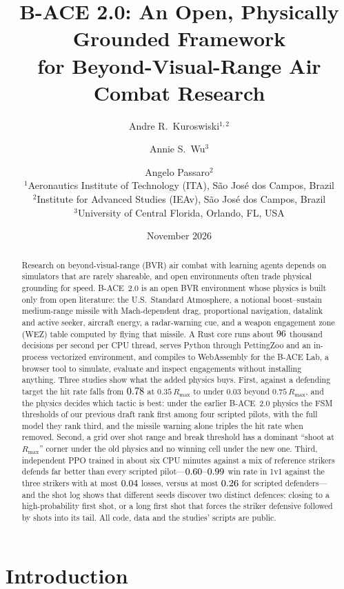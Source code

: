 \documentclass[11pt,a4paper]{article}
\title{\textbf{B-ACE 2.0}: An Open, Physically Grounded Framework\\
for Beyond-Visual-Range Air Combat Research}
\author{
Andre R.\ Kuroswiski$^{1,2}$ \and
Annie S.\ Wu$^{3}$ \and
Angelo Passaro$^{2}$\\[0.6em]
\small $^{1}$Aeronautics Institute of Technology (ITA), S\~{a}o Jos\'{e} dos Campos, Brazil\\
\small $^{2}$Institute for Advanced Studies (IEAv), S\~{a}o Jos\'{e} dos Campos, Brazil\\
\small $^{3}$University of Central Florida, Orlando, FL, USA
}
\date{November 2026}
\begin{document}
\maketitle
\thispagestyle{empty}

\begin{abstract}
\noindent
Research on beyond-visual-range (BVR) air combat with learning agents depends on simulators that are rarely shareable, and open environments often trade physical grounding for speed.
B-ACE~2.0 is an open BVR environment whose physics is built only from open literature: the U.S.\ Standard Atmosphere, a notional boost--sustain medium-range missile with Mach-dependent drag, proportional navigation, datalink and active seeker, aircraft energy, a radar-warning cue, and a weapon engagement zone (WEZ) table computed by flying that missile.
A Rust core runs about $96$ thousand decisions per second per CPU thread, serves Python through PettingZoo and an in-process vectorized environment, and compiles to WebAssembly for the B-ACE Lab, a browser tool to simulate, evaluate and inspect engagements without installing anything.
Three studies show what the added physics buys.
First, against a defending target the hit rate falls from $0.78$ at $0.35\,R_{\max}$ to under $0.03$ beyond $0.75\,R_{\max}$, and the physics decides which tactic is best: under the earlier B-ACE~2.0 physics the FSM thresholds of our previous draft rank first among four scripted pilots, with the full model they rank third, and the missile warning alone triples the hit rate when removed.
Second, a grid over shot range and break threshold has a dominant ``shoot at $R_{\max}$'' corner under the old physics and no winning cell under the new one.
Third, independent PPO trained in about six CPU minutes against a mix of reference strikers defends far better than every scripted pilot---$0.60$--$0.99$ win rate in 1v1 against the three strikers with at most $0.04$ losses, versus at most $0.26$ for scripted defenders---and the shot log shows that different seeds discover two distinct defences: closing to a high-probability first shot, or a long first shot that forces the striker defensive followed by shots into its tail.
All code, data and the studies' scripts are public.
\end{abstract}

\section{Introduction}
\end{document}
